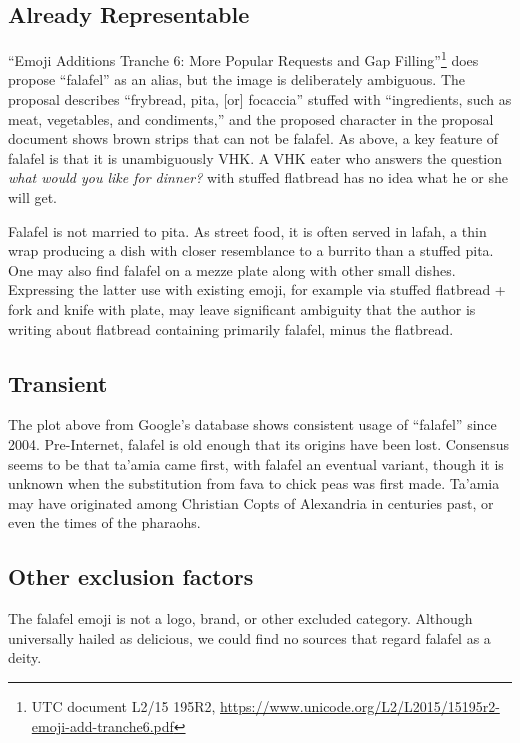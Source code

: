\documentclass[a4paper,10pt]{article}
\begin{document}
\subsection{Already Representable}

``Emoji Additions Tranche 6: More Popular Requests
and Gap Filling''\footnote{UTC document L2/15 195R2,
\url{https://www.unicode.org/L2/L2015/15195r2-emoji-add-tranche6.pdf}} does propose
``falafel'' as an alias, but the image is deliberately ambiguous. The proposal describes
``frybread, pita, [or] focaccia'' stuffed with ``ingredients, such as meat, vegetables,
and condiments,'' and the proposed character in the proposal document shows brown strips that
can not be falafel.  As above, a key feature of falafel is that it is unambiguously VHK.
A VHK eater who answers the question {\em what would you like for dinner?} with {\sc
stuffed flatbread} has no idea what he or she will get.

Falafel is not married to pita. As street food, it is often served in lafah,
a thin wrap producing a dish with closer resemblance to a burrito than a
stuffed pita. One may also find falafel on a mezze plate along with other small
dishes. Expressing the latter use with existing emoji, for example via {\sc stuffed
flatbread + fork and knife with plate}, may leave significant ambiguity that the author
is writing about flatbread containing primarily falafel, minus the flatbread.

\subsection{Transient}

The plot above from Google's database shows consistent usage of ``falafel'' 
since 2004. Pre-Internet, falafel is old enough that its
origins have been lost. Consensus seems to be that ta'amia came first, with falafel an
eventual variant, though it is unknown when the substitution from fava to chick peas
was first made.  Ta'amia may have originated among Christian Copts of Alexandria in
centuries past, or even the times of the pharaohs.

\subsection{Other exclusion factors}
The {\sc falafel} emoji is not a logo, brand, or other excluded category. Although
universally hailed as delicious, we could find no sources that regard falafel as a deity.
\end{document}
